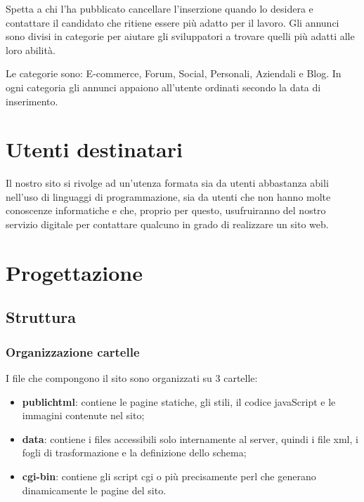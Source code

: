 \documentclass[12pt]{article}
\begin{document}
Spetta a chi l’ha pubblicato cancellare l'inserzione quando lo desidera e contattare il candidato che ritiene essere più adatto per il lavoro.
Gli annunci sono divisi in categorie per aiutare gli sviluppatori a trovare quelli più adatti alle loro abilità. 

Le categorie sono: E-commerce, Forum, Social, Personali, Aziendali e Blog.
In ogni categoria gli annunci appaiono all’utente ordinati secondo la data di inserimento.



\section{Utenti destinatari}
Il nostro sito si rivolge ad un’utenza formata sia da utenti abbastanza abili nell’uso di linguaggi di programmazione, sia da utenti che non hanno molte conoscenze informatiche e che, proprio per questo, usufruiranno del nostro servizio digitale per contattare qualcuno in grado di realizzare un sito web.
\newpage

\section{Progettazione}
	\subsection{Struttura}
		\subsubsection{Organizzazione cartelle}
		
		I file che compongono il sito sono organizzati su 3 cartelle:

		\begin{itemize}

			\item \textbf{public\textunderscore html}: contiene le pagine statiche, gli stili, il codice javaScript e le immagini contenute nel sito;
			\item \textbf{data}: contiene i files accessibili solo internamente al server, quindi i file xml, i fogli di trasformazione e la definizione dello schema;
			\item \textbf{cgi-bin}: contiene gli script cgi o più precisamente perl che generano dinamicamente le pagine del sito.

		\end{itemize}
\end{document}
